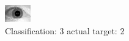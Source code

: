 \begin{figure}[h!]
\begin{center}
\includegraphics[width=0.60\columnwidth]{figures/ID1648_class_3_target_2.png}
\end{center}
\caption{ Classification: 3 actual target: 2}
\label{fig:ID1648_class_3_target_2}
\end{figure}
